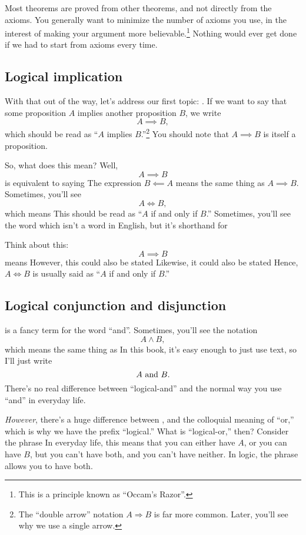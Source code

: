 Most theorems are proved from other theorems, and not directly from
the axioms. You generally want to minimize the number of axioms you
use, in the interest of making your argument more
believable.\footnote{This is a principle known as ``Occam's Razor''.}
Nothing would ever get done if we had to start from axioms every time.

\subsection{Logical implication}

With that out of the way, let's address our first topic:
. If we want to say that some proposition $A$
implies another proposition $B$, we write $$A \implies B,$$ which
should be read as ``$A$ implies $B$.''\footnote{The ``double arrow''
  notation $A \Rightarrow B$ is far more common. Later, you'll see why
  we use a single arrow.}  You should note that $A \implies B$ is
itself a proposition.

So, what does this mean? Well, $$A \implies B$$ is equivalent to
saying  The expression $B \impliedby A$ means
the same thing as $A \implies B.$ Sometimes, you'll see $$A \iff B,$$
which means  This
should be read as ``$A$ if and only if $B$.'' Sometimes, you'll see
the word  which isn't a word in English, but it's
shorthand for 

Think about this: $$A \implies B$$ means 
However, this could also be stated  Likewise, it
could also be stated  Hence, $A \iff B$ is
usually said as ``$A$ if and only if $B$.''

\subsection{Logical conjunction and disjunction}

 is a fancy term for the word
``and''. Sometimes, you'll see the notation $$A \land B,$$ which means
the same thing as  In this book, it's easy
enough to just use text, so I'll just write $$A \text{ and } B.$$ There's no
real difference between ``logical-and'' and the normal way you use
``and'' in everyday life.

\emph{However}, there's a huge difference between ,
and the colloquial meaning of ``or,'' which is why we have the prefix
``logical.'' What is ``logical-or,'' then? Consider the phrase
 In everyday life, this means that you can either
have $A$, or you can have $B$, but you can't have both, and you can't
have neither. In logic, the phrase  allows you to
have both.

